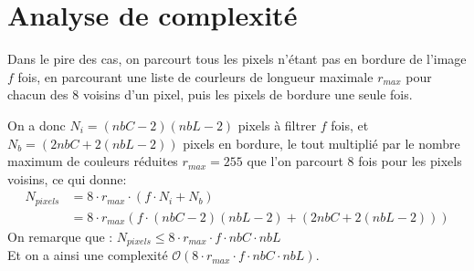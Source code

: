 \documentclass[a4paper, 11pt]{article}
\begin{document}
\section*{Analyse de complexité}
\begin{minipage}{0.5\linewidth}
Dans le pire des cas, on parcourt tous les pixels n'étant pas en bordure de l'image $f$ fois, en parcourant une liste de courleurs de longueur maximale $r_{max}$ pour chacun des 8 voisins d'un pixel, puis les pixels de bordure une seule fois.

On a donc $N_i = (nbC - 2)(nbL-2)$ pixels à filtrer $f$ fois, et $N_b = (2nbC + 2(nbL-2))$ pixels en bordure, le tout multiplié par le nombre maximum de couleurs réduites $r_{max} = 255$ que l'on parcourt 8 fois pour les pixels voisins, ce qui donne:
\begin{align}
N_{pixels} &= 8 \cdot r_{max} \cdot (f \cdot N_i + N_b ) \nonumber \\
&= 8 \cdot r_{max}  (f \cdot (nbC - 2)(nbL-2) + (2nbC + 2(nbL-2))) \nonumber
\end{align}
On remarque que : $N_{pixels} \leq 8\cdot r_{max}\cdot f\cdot nbC\cdot nbL$\\

Et on a ainsi une complexité $\mathcal{O}(8\cdot r_{max}\cdot f\cdot nbC\cdot nbL)$.
\end{minipage}\hfil
\end{document}
